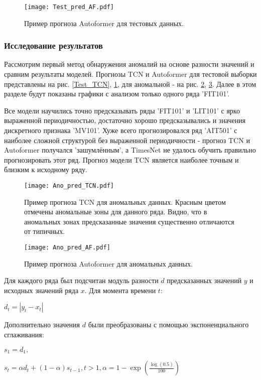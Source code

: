 \documentclass{article}
\begin{document}
\begin{figure}[H]
\centering
\texttt{[image: Test\_pred\_AF.pdf]}
\caption{Пример прогноза Autoformer для тестовых данных.}
\label{Test_AF}
\end{figure}

\subsubsection{Исследование результатов}

Рассмотрим первый метод обнаружения аномалий на основе разности значений и сравним результаты моделей. Прогнозы TCN и Autoformer для тестовой выборки представлены на рис. \ref{Test_TCN}, \ref{Test_AF}, для аномальной - на рис.  \ref{Ano_TCN}, \ref{Ano_AF}. Далее в этом разделе будут показаны графики с анализом только одного ряда 'FIT101'.

Все модели научились точно предсказывать ряды 'FIT101' и 'LIT101' с ярко выраженной периодичностью, достаточно хорошо предсказывались и значения дискретного признака 'MV101'. Хуже всего прогнозировался ряд 'AIT501' с наиболее сложной структурой без выраженной периодичности - прогноз TCN и Autoformer получался 'зашумлённым', а TimesNet не удалось обучить правильно прогнозировать этот ряд. Прогноз модели TCN является наиболее точным и близким к исходному ряду. 

\begin{figure}[H]
\centering
\texttt{[image: Ano\_pred\_TCN.pdf]}
\caption{Пример прогноза TCN для аномальных данных. Красным цветом отмечены аномальные зоны для данного ряда. Видно, что в аномальных зонах предсказанные значения существенно отличаются от типичных.}
\label{Ano_TCN}
\end{figure}

\begin{figure}[H]
\centering
\texttt{[image: Ano\_pred\_AF.pdf]}
\caption{Пример прогноза Autoformer для аномальных данных.}
\label{Ano_AF}
\end{figure}

Для каждого ряда был подсчитан модуль разности $d$ предсказанных значений $y$ и исходных значений ряда $x$. Для момента времени $t$:

$d_t = |y_t - x_t|$

Дополнительно значения $d$ были преобразованы с помощью экспоненциального сглаживания: 

$s_1 = d_1,$

$s_t = \alpha d_t + (1 - \alpha)s_{t-1},  t > 1,  \alpha = 1 - \exp(\frac{\log(0.5)}{100})$
\end{document}
